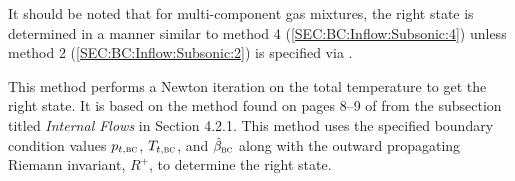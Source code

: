 
It should be noted that for multi-component gas mixtures, the right state is
determined in a manner similar to method 4 (\ref{SEC:BC:Inflow:Subsonic:4})
unless method 2 (\ref{SEC:BC:Inflow:Subsonic:2}) is specified via
.



\label{SEC:BC:Inflow:Subsonic:1}

This method performs a Newton iteration on the total temperature to get the
right state.
%
It is based on the method found on pages 8--9 of  from
the subsection titled \emph{Internal Flows} in Section 4.2.1.
%
This method uses the specified boundary condition values $p_{t,\textsc{bc}}$,
$T_{t,\textsc{bc}}$, and $\hat{\beta}_{\textsc{bc}}$ along with the outward propagating
Riemann invariant, $R^+$, to determine the right state.


